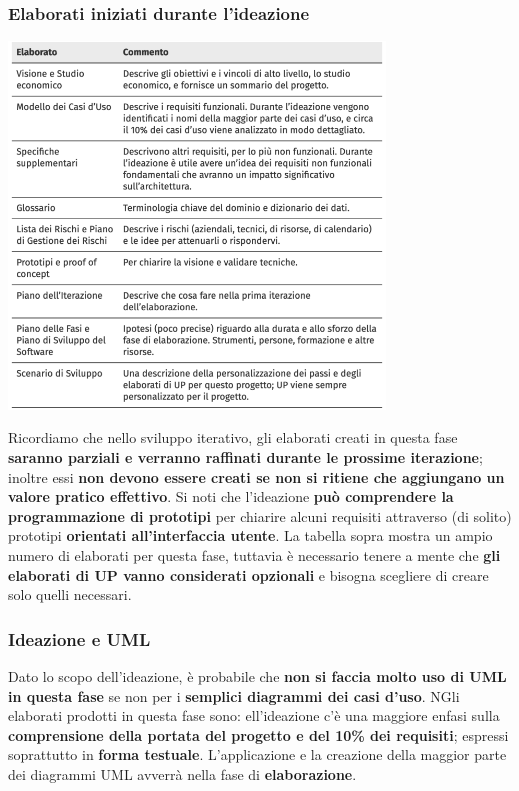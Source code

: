 \documentclass[12pt]{article}
\begin{document}
\subsubsection{Elaborati iniziati durante l'ideazione}
\begin{center}
    \includegraphics[width = 0.75\textwidth]{Images/26.png}
\end{center}
Ricordiamo che nello sviluppo iterativo, gli elaborati creati in questa fase \textbf{saranno parziali e verranno raffinati durante le prossime iterazione}; inoltre essi \textbf{non devono essere creati se non si ritiene che aggiungano un valore pratico effettivo}.
Si noti che l'ideazione \textbf{può comprendere la programmazione di prototipi} per chiarire alcuni requisiti attraverso (di solito) prototipi \textbf{orientati all'interfaccia utente}.
La tabella sopra mostra un ampio numero di elaborati per questa fase, tuttavia è necessario tenere a mente che \textbf{gli elaborati di UP vanno considerati opzionali} e bisogna scegliere di creare solo quelli necessari.
\subsubsection{Ideazione e UML}
Dato lo scopo dell'ideazione, è probabile che \textbf{non si faccia molto uso di UML in questa fase} se non per i \textbf{semplici diagrammi dei casi d'uso}.
NGli elaborati prodotti in questa fase sono:
ell'ideazione c'è una maggiore enfasi sulla \textbf{comprensione della portata del progetto e del 10\% dei requisiti}; espressi soprattutto in \textbf{forma testuale}.
L'applicazione e la creazione della maggior parte dei diagrammi UML avverrà nella fase di \textbf{elaborazione}.
\end{document}
